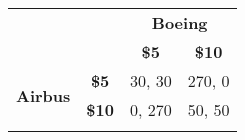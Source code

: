 \documentclass{standalone}
\begin{document}
\begin{tabular}{rccc}
& & \multicolumn{2}{c}{\textbf{Boeing}} \\
& & \textbf{\$5} & \textbf{\$10} \\ 
\cline{3-4}
\multirow{2}{*}{\textbf{Airbus}}& \textbf{\$5} & \multicolumn{1}{|c|}{30, 30} & \multicolumn{1}{c|}{270, 0} \\ 
\cline{3-4}
& \textbf{\$10} & \multicolumn{1}{|c|}{0, 270} & \multicolumn{1}{c|}{50, 50} \\ 
\cline{3-4}\\
\end{tabular}
\end{document}
